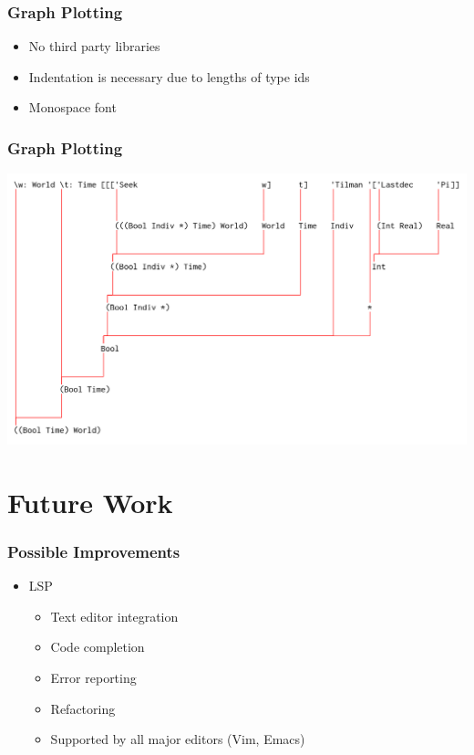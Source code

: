 \documentclass{beamer}
\begin{document}
\begin{frame}
    \frametitle{Graph Plotting}
    \begin{itemize}
        \item No third party libraries
        \item Indentation is necessary due to lengths of type ids
        \item Monospace font
    \end{itemize}
\end{frame}

\begin{frame}
    \frametitle{Graph Plotting}
    \begin{center}
        \includegraphics[width=0.9\columnwidth]{graph.png}
    \end{center}
\end{frame}

\section{Future Work}

\begin{frame}
    \frametitle{Possible Improvements}
    \begin{itemize}
        \item LSP
            \begin{itemize}
                \item Text editor integration
                \item Code completion
                \item Error reporting
                \item Refactoring
                \item Supported by all major editors (Vim, Emacs)
            \end{itemize}
    \end{itemize}
\end{frame}
\end{document}
